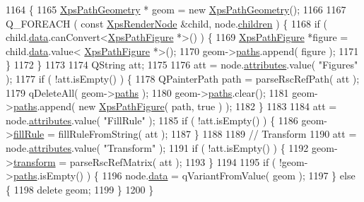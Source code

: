 \begin{DoxyCode}
1164 \{
1165     \hyperlink{structXpsPathGeometry}{XpsPathGeometry} * geom = \textcolor{keyword}{new} \hyperlink{structXpsPathGeometry}{XpsPathGeometry}();
1166 
1167     Q\_FOREACH ( \textcolor{keyword}{const} \hyperlink{classXpsRenderNode}{XpsRenderNode} &child, node.\hyperlink{classXpsRenderNode_a8a1cc47feef96fa119b2491e60ebeb09}{children} ) \{
1168         \textcolor{keywordflow}{if} ( child.\hyperlink{classXpsRenderNode_a1b07b9ac5eb86bec6d9f94ec5c855065}{data}.canConvert<\hyperlink{structXpsPathFigure}{XpsPathFigure} *>() ) \{
1169             \hyperlink{structXpsPathFigure}{XpsPathFigure} *figure = child.\hyperlink{classXpsRenderNode_a1b07b9ac5eb86bec6d9f94ec5c855065}{data}.value<
      \hyperlink{structXpsPathFigure}{XpsPathFigure} *>();
1170             geom->\hyperlink{structXpsPathGeometry_a2623aacaaadb1ac2b4c7cb2c5ded4b7b}{paths}.append( figure );
1171         \}
1172     \}
1173 
1174     QString att;
1175 
1176     att = node.\hyperlink{classXpsRenderNode_a7f6fca2e06dd119e7eb20139af6c8477}{attributes}.value( \textcolor{stringliteral}{"Figures"} );
1177     \textcolor{keywordflow}{if} ( !att.isEmpty() ) \{
1178         QPainterPath path = parseRscRefPath( att );
1179         qDeleteAll( geom->\hyperlink{structXpsPathGeometry_a2623aacaaadb1ac2b4c7cb2c5ded4b7b}{paths} );
1180         geom->\hyperlink{structXpsPathGeometry_a2623aacaaadb1ac2b4c7cb2c5ded4b7b}{paths}.clear();
1181         geom->\hyperlink{structXpsPathGeometry_a2623aacaaadb1ac2b4c7cb2c5ded4b7b}{paths}.append( \textcolor{keyword}{new} \hyperlink{structXpsPathFigure}{XpsPathFigure}( path, \textcolor{keyword}{true} ) );
1182     \}
1183 
1184     att = node.\hyperlink{classXpsRenderNode_a7f6fca2e06dd119e7eb20139af6c8477}{attributes}.value( \textcolor{stringliteral}{"FillRule"} );
1185     \textcolor{keywordflow}{if} ( !att.isEmpty() ) \{
1186         geom->\hyperlink{structXpsPathGeometry_a5588ce9b578b7557dab8a31d04e09fef}{fillRule} = fillRuleFromString( att );
1187     \}
1188 
1189     \textcolor{comment}{// Transform}
1190     att = node.\hyperlink{classXpsRenderNode_a7f6fca2e06dd119e7eb20139af6c8477}{attributes}.value( \textcolor{stringliteral}{"Transform"} );
1191     \textcolor{keywordflow}{if} ( !att.isEmpty() ) \{
1192         geom->\hyperlink{structXpsPathGeometry_a9ff5ab784e20e3a6fc70189f2bef8f72}{transform} = parseRscRefMatrix( att );
1193     \}
1194 
1195     \textcolor{keywordflow}{if} ( !geom->\hyperlink{structXpsPathGeometry_a2623aacaaadb1ac2b4c7cb2c5ded4b7b}{paths}.isEmpty() ) \{
1196         node.\hyperlink{classXpsRenderNode_a1b07b9ac5eb86bec6d9f94ec5c855065}{data} = qVariantFromValue( geom );
1197     \} \textcolor{keywordflow}{else} \{
1198         \textcolor{keyword}{delete} geom;
1199     \}
1200 \}
\end{DoxyCode}
